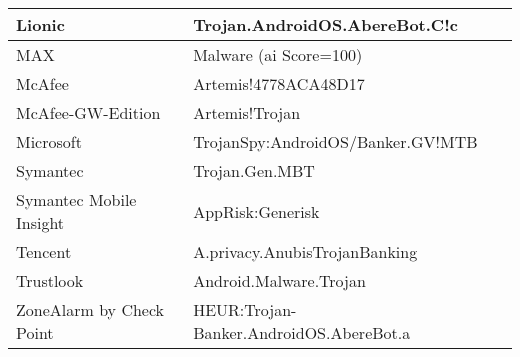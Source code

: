 \begin{tabular}{ |l|l| }
    \hline
        Lionic  &   Trojan.AndroidOS.AbereBot.C!c \\
    \hline
        MAX     &   Malware (ai Score=100) \\
    \hline
        McAfee  &   Artemis!4778ACA48D17 \\
    \hline
        McAfee-GW-Edition   &   Artemis!Trojan \\
    \hline
        Microsoft   &   TrojanSpy:AndroidOS/Banker.GV!MTB \\
    \hline
        Symantec    &   Trojan.Gen.MBT \\
    \hline
        Symantec Mobile Insight     &   AppRisk:Generisk \\
    \hline
        Tencent     &   A.privacy.AnubisTrojanBanking \\
    \hline
        Trustlook   &   Android.Malware.Trojan \\
    \hline
        ZoneAlarm by Check Point    &   HEUR:Trojan-Banker.AndroidOS.AbereBot.a \\
    \hline
\end{tabular}